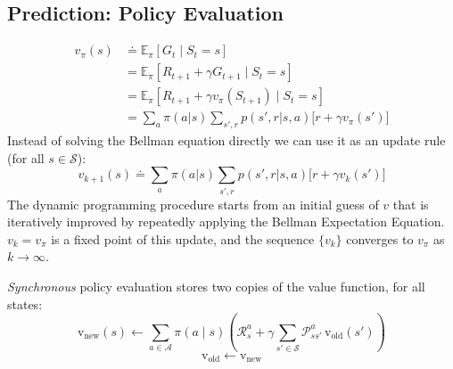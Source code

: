 \subsection{Prediction: Policy Evaluation}
\begin{equation}
  \begin{split}
    v_\pi(s) &\doteq \mathbb{E}_\pi[G_t \mid S_t=s] \\
      &= \mathbb{E}_\pi[R_{t+1}+\gamma G_{t+1} \mid S_t=s] \\
      &= \mathbb{E}_\pi[R_{t+1}+\gamma v_\pi(S_{t+1}) \mid S_t=s] \\
      &= \sum_{a}\pi(a|s)\sum_{s',r}p(s',r|s,a)\bigl[r+\gamma v_\pi(s')\bigr]
  \end{split}
\end{equation}
Instead of solving the Bellman equation directly we can use it as an update rule (for all $s\in\mathcal{S}$):
\begin{equation}
  v_{k+1}(s) \doteq \sum_{a}\pi(a|s)\sum_{s',r}p(s',r|s,a)\bigl[r+\gamma v_k(s')\bigr]
\end{equation}
The dynamic programming procedure starts from an initial guess of $v$ that is iteratively improved by repeatedly applying the Bellman Expectation Equation. $v_k=v_\pi$ is a fixed point of this update, and the sequence $\{v_k\}$ converges to $v_\pi$ as $k\to\infty$.

\emph{Synchronous} policy evaluation stores two copies of the value
function, for all states:
\[
  \mathrm{v}_{\text{new}}(s) \leftarrow \sum_{a \in \mathcal{A}}\pi(a\mid s)
  \left( \mathcal{R}_s^a + \gamma \sum_{s' \in \mathcal{S}}
  \mathcal{P}_{ss'}^a \, \mathrm{v}_{\text{old}}(s') \right)
\]
\[
  \mathrm{v}_{\text{old}} \leftarrow \mathrm{v}_{\text{new}}
\]

